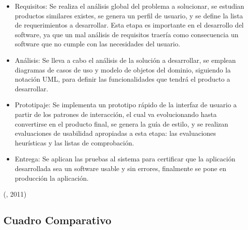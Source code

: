 \begin{itemize}

    \item Requisitos: Se realiza el análisis global del problema a solucionar, se estudian productos similares existes, se genera un perfil de usuario, y se define la lista de requerimientos a desarrollar. Esta etapa es importante en el desarrollo del software, ya que un mal análisis de requisitos traería como consecuencia un software que no cumple con las necesidades del usuario.

    \item Análisis: Se lleva a cabo el análisis de la solución a desarrollar, se emplean diagramas de casos de uso y modelo de objetos del dominio, siguiendo la notación UML, para definir las funcionalidades que tendrá el producto a desarrollar.

    \item Prototipaje: Se implementa un prototipo rápido de la interfaz de usuario a partir de los patrones de interacción, el cual va evolucionando hasta convertirse en el producto final, se genera la guía de estilo, y se realizan evaluaciones de usabilidad apropiadas a esta etapa: las evaluaciones heurísticas y las listas de comprobación.

    \item Entrega: Se aplican las pruebas al sistema para certificar que la aplicación desarrollada sea un software usable y sin errores, finalmente se pone en producción la aplicación.

\end{itemize}

(\citet{agilusbib}, 2011) 

\subsection{Cuadro Comparativo}


